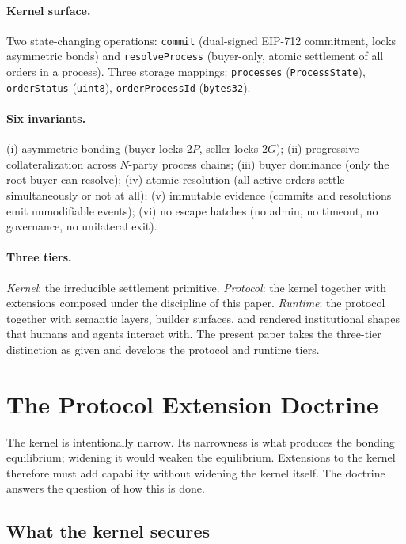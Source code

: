 \documentclass[11pt,a4paper]{article}
\theoremstyle{definition}
\theoremstyle{remark}
\begin{document}
\paragraph{Kernel surface.}
Two state-changing operations: \texttt{commit} (dual-signed EIP-712
commitment, locks asymmetric bonds) and \texttt{resolveProcess}
(buyer-only, atomic settlement of all orders in a process). Three
storage mappings: \texttt{processes} (\texttt{ProcessState}),
\texttt{orderStatus} (\texttt{uint8}), \texttt{orderProcessId}
(\texttt{bytes32}).

\paragraph{Six invariants.}
(i) asymmetric bonding (buyer locks $2P$, seller locks $2G$);
(ii) progressive collateralization across $N$-party process chains;
(iii) buyer dominance (only the root buyer can resolve);
(iv) atomic resolution (all active orders settle simultaneously or
not at all);
(v) immutable evidence (commits and resolutions emit unmodifiable
events);
(vi) no escape hatches (no admin, no timeout, no governance, no
unilateral exit).

\paragraph{Three tiers.}
\emph{Kernel}: the irreducible settlement primitive. \emph{Protocol}:
the kernel together with extensions composed under the discipline of
this paper. \emph{Runtime}: the protocol together with semantic
layers, builder surfaces, and rendered institutional shapes that
humans and agents interact with. The present paper takes the
three-tier distinction as given and develops the protocol and
runtime tiers.

\section{The Protocol Extension Doctrine}
\label{sec:doctrine}

The kernel is intentionally narrow. Its narrowness is what produces
the bonding equilibrium; widening it would weaken the equilibrium. Extensions to the kernel therefore must add capability
without widening the kernel itself. The doctrine answers the question
of how this is done.

\subsection{What the kernel secures}
\end{document}
